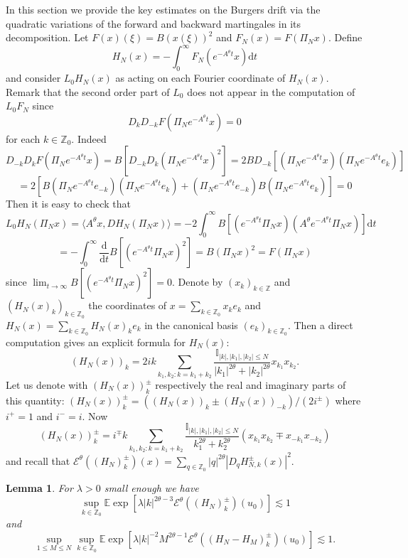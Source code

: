 \documentclass[11pt,a4paper,reqno]{amsart}
\newtheorem{lemma}{Lemma}
\newcommand{\II}{\mathbb{I}}
\newcommand{\ZZ}{\mathbb{Z}}
\newcommand{\expect}{\mathbb{E}}
\newcommand{\cE}{\mathcal{E}}
\newcommand{\dd}{\mathrm{d}}
\begin{document}
In this section we provide the key estimates on the Burgers drift via the quadratic variations of the forward and backward martingales in its decomposition.
Let $F(x)(\xi) = B (x(\xi))^2$ and $F_N(x) = F(\Pi_N x)$. Define 
$$
H_N(x) = -\int_0^\infty F_N(e^{-A^\theta t}x)\dd t
$$
and consider $L_0 H_N(x)$ as acting on each Fourier coordinate of $H_N(x)$. Remark that the second order part of $L_0$ does not appear in the computation of $L_0 F_N$ since 
$$
D_k D_{-k} F(\Pi_N e^{-A^\theta t} x)=0
$$ for each $k\in\ZZ_0$. Indeed
$$
D_{-k} D_k F(\Pi_N e^{-A^\theta t} x) = B [D_{-k} D_k (\Pi_N e^{-A^\theta t} x)^2]=2 B D_{-k} [(\Pi_N e^{-A^\theta t} x) (\Pi_N e^{-A^\theta t} e_k)]
$$
$$
=2   [B(\Pi_N e^{-A^\theta t} e_{-k}) (\Pi_N e^{-A^\theta t} e_k)+(\Pi_N e^{-A^\theta t} e_{-k}) B(\Pi_N e^{-A^\theta t} e_k)] = 0
$$
Then it is easy to check that 
$$
L_0 H_N(\Pi_N x) = \langle A^\theta x, D H_N(\Pi_N x)\rangle  = -2 \int_0^\infty B [(e^{-A^\theta t}\Pi_N x)(A^\theta e^{-A^\theta t} \Pi_N x) ]\dd t
$$
$$
=  -\int_0^\infty \frac{\dd }{\dd t}B [(e^{-A^\theta t}\Pi_N x)^2 ] = B (\Pi_N x)^2=F(\Pi_N x)
$$
since $\lim_{t\to \infty} B [(e^{-A^\theta t}\Pi_N x)^2 ]  = 0$. Denote by $(x_k)_{k\in\ZZ}$ and $(H_N(x)_k)_{k\in\ZZ_0}$ the coordinates of $x=\sum_{k\in\ZZ_0} x_k e_k$ and $H_N(x)=\sum_{k\in\ZZ_0} H_N(x)_k e_k$  in the canonical basis $(e_k)_{k\in\ZZ_0}$. Then a direct computation gives an explicit formula for $H_N(x)$:
$$
(H_{N}(x))_k =
2 ik  \sum_{k_1,k_2 : k=k_1+k_2}  \frac{\II_{|k|,|k_1|,|k_2|\le N}}{|k_1|^{2\theta}+|k_2|^{2\theta}} x_{k_1} x_{k_2}.
$$
Let us denote with $(H_{N}(x))_k^{\pm}$ respectively the real and imaginary parts of this quantity: $(H_{N}(x))_k^{\pm}= ((H_{N}(x))_k\pm (H_{N}(x))_{-k})/(2 i^{\pm})$ where $i^+=1$ and $i^-=i$. Now
$$
(H_{N}(x))^\pm_k =
 i^{\mp}k  \sum_{k_1,k_2 : k=k_1+k_2}  \frac{\II_{|k|,|k_1|,|k_2|\le N}}{k_1^{2\theta}+k_2^{2\theta}} (x_{k_1} x_{k_2}\mp x_{-k_1} x_{-k_2})
$$
and recall that
$
\cE^\theta((H_N)^\pm_k)(x) = \sum_{q\in\ZZ_0} |q|^{2\theta} |D_q H^\pm_{N,k}(x)|^2
$.
\begin{lemma}
\label{lemma:energy-estimates}
For $\lambda >0$ small enough we have
\begin{equation}
\label{eq:first-energy-estimate}
\sup_{k\in\ZZ_0} \expect \exp\left[\lambda |k|^{2\theta-3}  \cE^\theta((H_N)^\pm_k)(u_0)\right] \lesssim 1
\end{equation}
and
\begin{equation}
\label{eq:second-energy-estimate}
\sup_{1\le M \le N}\sup_{k\in\ZZ_0} \expect \exp\left[\lambda |k|^{-2} M^{2\theta-1}  \cE^\theta((H_N-H_M)^\pm_k)(u_0)\right] \lesssim 1.
\end{equation}
\end{lemma}
\end{document}
